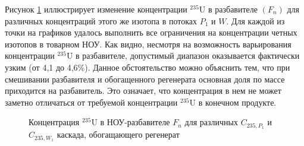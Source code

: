 


Рисунок \ref{fig3__7} иллюстрирует изменение концентрации $^{235}$U в разбавителе $(F_n)$ для различных концентраций этого же изотопа в потоках $P_1$ и $W$. Для каждой из точки на графиков удалось выполнить все ограничения на концентрации четных изотопов в товарном НОУ. Как видно, несмотря на возможность варьирования концентрации $^{235}$U в разбавителе, допустимый диапазон оказывается фактически узким (от 4,1 до 4,6\%). Данное обстоятельство можно объяснить тем, что при смешивании разбавителя и обогащенного регенерата основная доля по массе приходится на разбавитель. Это означает, что концентрация в нем не может заметно отличаться от требуемой концентрации $^{235}$U в конечном продукте.   

\begin{figure}[ht]
  \caption{Концентрация $^{235}$U в НОУ-разбавителе $F_n$ для различных $C_{235, P_1}$ и $C_{235, W_1}$ каскада, обогащающего регенерат}\label{fig3__7}
\end{figure}

